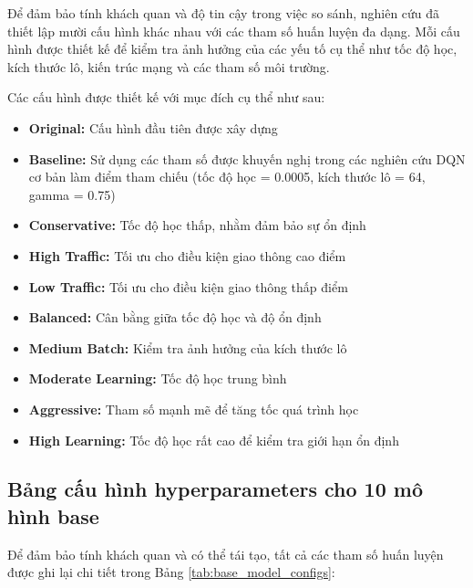 Để đảm bảo tính khách quan và độ tin cậy trong việc so sánh, nghiên cứu đã thiết
lập mười cấu hình khác nhau với các tham số huấn luyện đa dạng. Mỗi cấu hình
được thiết kế để kiểm tra ảnh hưởng của các yếu tố cụ thể như tốc độ học, kích thước
lô, kiến trúc mạng và các tham số môi trường.

Các cấu hình được thiết kế với mục đích cụ thể như sau:
\begin{itemize}
    \item \textbf{Original:} Cấu hình đầu tiên được xây dựng
    
    \item \textbf{Baseline:} Sử dụng các tham số được khuyến nghị trong các nghiên cứu DQN cơ bản làm điểm tham chiếu (tốc độ học = 0.0005, kích thước lô = 64, gamma = 0.75) 

    \item \textbf{Conservative:} Tốc độ học thấp, nhằm đảm bảo sự ổn định

    \item \textbf{High Traffic:} Tối ưu cho điều kiện giao thông cao điểm

    \item \textbf{Low Traffic:} Tối ưu cho điều kiện giao thông thấp điểm

    \item \textbf{Balanced:} Cân bằng giữa tốc độ học và độ ổn định

    \item \textbf{Medium Batch:} Kiểm tra ảnh hưởng của kích thước lô

    \item \textbf{Moderate Learning:} Tốc độ học trung bình


    \item \textbf{Aggressive:} Tham số mạnh mẽ để tăng tốc quá trình học

    \item \textbf{High Learning:} Tốc độ học rất cao để kiểm tra giới hạn ổn định
\end{itemize}

\subsection{Bảng cấu hình hyperparameters cho 10 mô hình base}

Để đảm bảo tính khách quan và có thể tái tạo, tất cả các tham số huấn luyện được ghi lại chi tiết trong Bảng \ref{tab:base_model_configs}:

